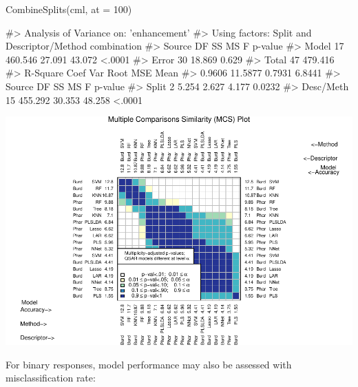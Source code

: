 \begin{Schunk}
\begin{Sinput}
CombineSplits(cml, at = 100)
\end{Sinput}
\begin{Soutput}
#>    Analysis of Variance on: 'enhancement'
#>  Using factors: Split and Descriptor/Method combination
#> Source    DF        SS        MS         F   p-value   
#> Model     17   460.546    27.091    43.072    <.0001   
#> Error     30    18.869     0.629   
#> Total     47   479.416   
#>       R-Square   Coef Var   Root MSE       Mean   
#>         0.9606    11.5877     0.7931     6.8441   
#> Source       DF        SS        MS         F   p-value   
#> Split         2     5.254     2.627     4.177    0.0232   
#> Desc/Meth    15   455.292    30.353    48.258    <.0001
\end{Soutput}

\includegraphics{chemmodlabRJournal_files/figure-latex/CombineSplits_ie_100-1} \end{Schunk}

For binary responses, model performance may also be assessed with
misclassification rate:

